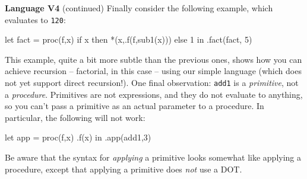 \begin{minipage}[t]{\sw}
\slidenumber
\LARGE
{\bf Language V4} (continued)\exx
Finally consider the following example,
which evaluates to \verb'120':
{\Large
\begin{qv}
let
  fact = proc(f,x)
    if x
    then *(x,.f(f,sub1(x)))
    else 1
in
  .fact(fact, 5)
\end{qv}
}
This example,
quite a bit more subtle than the previous ones,
shows how you can achieve recursion --
factorial, in this case --
using our simple language (which does not yet support direct recursion!).\exx
One final observation: \verb'add1' is a {\em primitive}, not a {\em procedure}.
Primitives are not expressions, and they do not evaluate to anything,
so you can't pass a primitive as an actual parameter to a procedure.
In particular, the following will not work:
{
\Large
\begin{qv}
let
  app = proc(f,x) .f(x)
in
  .app(add1,3)
\end{qv}
}
Be aware that the syntax for {\em applying} a primitive looks somewhat
like applying a procedure,
except that applying a primitive does {\em not} use a DOT.
\end{minipage}
\clearpage
